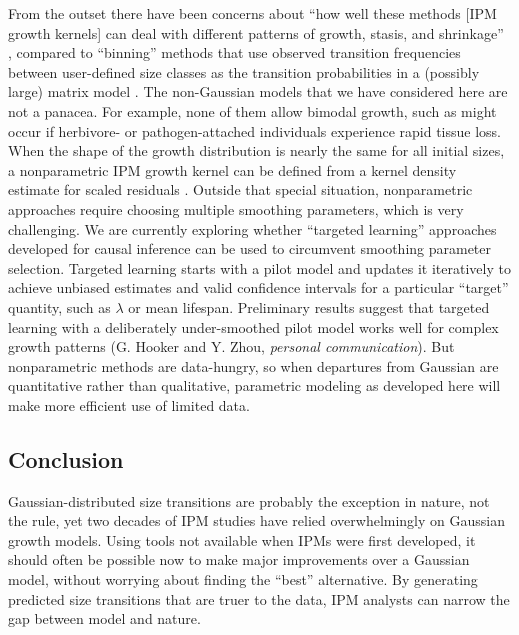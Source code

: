 \documentclass[12pt]{article}
\begin{document}
\begin{spacing}{1.9}
From the outset there have been concerns about ``how well these methods [IPM growth kernels] can deal with different patterns of growth, stasis, and shrinkage'' \citep[][p. 200]{morris-doak-2002}, compared to ``binning'' methods that use observed transition frequencies between user-defined size classes as the transition probabilities in a (possibly large) matrix model \citep{doak-critical-2021}. 
The non-Gaussian models that we have considered here are not a panacea. 
For example, none of them allow bimodal growth, such as might occur if herbivore- or pathogen-attached individuals experience rapid tissue loss. 
When the shape of the growth distribution is nearly the same for all initial sizes, a nonparametric IPM growth kernel can be defined from a kernel density estimate for scaled residuals \citep[][p. 288]{ellner-etal-2016}. 
Outside that special situation, nonparametric approaches require choosing multiple smoothing parameters, which is very challenging. 
We are currently exploring whether ``targeted learning'' approaches developed for causal inference \citep{vande-rose-2011} can be used to circumvent smoothing parameter selection. 
Targeted learning starts with a pilot model and updates it iteratively to achieve unbiased estimates and valid confidence intervals for a particular ``target'' quantity, such as $\lambda$ or mean lifespan. 
Preliminary results suggest that targeted learning with a deliberately under-smoothed pilot model works well for complex growth patterns (G. Hooker and Y. Zhou, \emph{personal communication}). 
But nonparametric methods are data-hungry, so when departures from Gaussian are quantitative rather than qualitative, parametric modeling as developed here will make more efficient use of limited data.

 \subsection*{Conclusion}
Gaussian-distributed size transitions are probably the exception in nature, not the rule, yet two decades of IPM studies have relied overwhelmingly on Gaussian growth models. 
Using tools not available when IPMs were first developed, %
it should often be possible now to make major improvements over a Gaussian model, without worrying about finding the ``best'' alternative. 
By generating predicted size transitions that are truer to the data, IPM analysts can narrow the gap between model and nature. 


\end{spacing}
\end{document}
